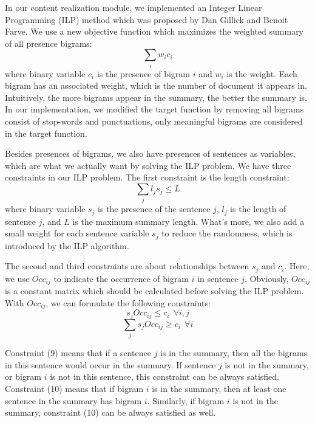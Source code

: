 \documentclass[11pt]{article}
\begin{document}
In our content realization module, we implemented an Integer Linear Programming (ILP) method which was proposed by Dan Gillick and Benoit Farve. We use a new objective function which maximizes the weighted summary of all presence bigrams:  
\begin{equation}
	\sum_i{w_ic_i}
\end{equation} 
where binary variable $c_i$ is the presence of bigram $i$ and $w_i$ is the weight. Each bigram has an associated weight, which is the number of document it appears in. Intuitively, the more bigrams appear in the summary, the better the summary is. In our implementation, we modified the target function by removing all bigrams consist of stop-words and punctuations, only meaningful bigrams are considered in the target function. 

Besides presences of bigrams, we also have presences of sentences as variables, which are what we actually want by solving the ILP problem. We have three constraints in our ILP problem. The first constraint is the length constraint:
\begin{equation}
	\sum_j{l_js_j} \leq L 
\end{equation} 
where binary variable $s_j$ is the presence of the sentence $j$, $l_j$ is the length of sentence $j$, and $L$ is the maximum summary length. What's more, we also add a small weight for each sentence variable $s_j$ to reduce the randomness, which is introduced by the ILP algorithm. 

The second and third constraints are about relationships between $s_j$ and $c_i$. Here, we use $Occ_{ij}$ to indicate the occurrence of bigram $i$ in sentence $j$. Obviously, $Occ_{ij}$ is a constant matrix which should be calculated before solving the ILP problem. With $Occ_{ij}$, we can formulate the following constraints:
\begin{equation}
	s_jOcc_{ij} \leq c_i\ \  \forall i,j
\end{equation}
\begin{equation}
	\sum_j s_jOcc_{ij} \geq c_i\ \  \forall i
\end{equation}

Constraint (9) means that if a sentence $j$ is in the summary, then all the bigrams in this sentence would occur in the summary. If sentence $j$ is not in the summary, or bigram $i$ is not in this sentence, this constraint can be always satisfied. Constraint (10) means that if bigram $i$ is in the summary, then at least one sentence in the summary has bigram $i$. Similarly, if bigram $i$ is not in the summary, constraint (10) can be always satisfied as well.
\end{document}
